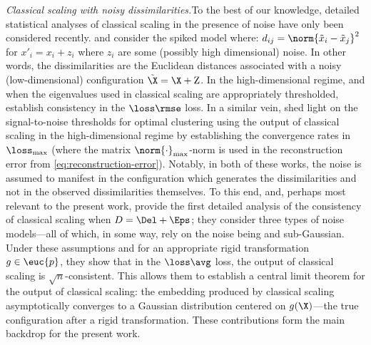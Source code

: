 \textit{Classical scaling with noisy dissimilarities.}\quad To the best of our knowledge, detailed statistical analyses of classical scaling in the presence of noise have only been considered recently. \cite{peterfreund2021multidimensional} and \cite{little2023analysis} consider the spiked model where: $d_{ij} = \norm{\tilde{x}_i - \tilde{x}_j}^2$ for ${x}'_i = x_i + z_i$ where $z_i$ are some (possibly high dimensional) noise. In other words, { the dissimilarities are the Euclidean distances associated with a noisy (low-dimensional) configuration} $\tilde{\X} = \X + \mathrm{Z}$. 
In the high-dimensional regime, and when the eigenvalues used in classical scaling are appropriately thresholded, \cite{peterfreund2021multidimensional} establish consistency in the $\loss\rmse$ loss. In a similar vein, \cite{little2023analysis} shed light on the signal-to-noise thresholds for optimal clustering using the output of classical scaling in the high-dimensional regime by establishing the convergence rates in $\loss_{\max}$ ({{where the matrix $\norm{\cdot}_{\max}$-norm is used in the reconstruction error from \cref{eq:reconstruction-error}}}). Notably, in both of these works, the noise is assumed to manifest in the configuration which generates the dissimilarities and not in the observed dissimilarities themselves. To this end, and, perhaps most relevant to the present work, \cite{li2020central} provide the first detailed analysis of the consistency of classical scaling when $D = \Del + \Eps$; they consider three types of noise models---all of which, in some way, rely on the noise being \iid{} and sub-Gaussian. Under these assumptions and for an appropriate rigid transformation $g \in \euc{p}$, they show that in the $\loss\avg$ loss, the output of classical scaling is $\sqrt{n}$-consistent. This allows them to establish a central limit theorem for the output of classical scaling: the embedding produced by classical scaling asymptotically converges to a Gaussian distribution centered on $g(\X)$---the true configuration after a rigid transformation. These contributions form the main backdrop for the present work.